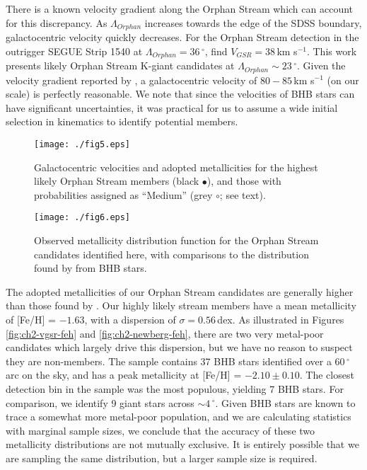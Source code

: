 There is a known velocity gradient along the Orphan Stream which can account for this discrepancy. As $\Lambda_{Orphan}$ increases towards the edge of the SDSS boundary, galactocentric velocity quickly decreases. For the Orphan Stream detection in the outrigger SEGUE Strip 1540 at $\Lambda_{Orphan} = 36\,^\circ$, \citet{Newberg_et-al_2010} find $V_{GSR} = 38$\,km s$^{-1}$. This work presents likely Orphan Stream K-giant candidates at $\Lambda_{Orphan} \sim 23\,^\circ$. Given the velocity gradient reported by \citet{Newberg_et-al_2010}, a galactocentric velocity of $80-85$\,km s$^{-1}$ (on our scale) is perfectly reasonable. We note that since the velocities of BHB stars can have significant uncertainties, it was practical for us to assume a wide initial selection in kinematics to identify potential members. 

\begin{figure}[h!]
	\texttt{[image: ./fig5.eps]}
	\caption{Galactocentric velocities and adopted metallicities for the highest likely Orphan Stream members (black $\bullet$), and those with probabilities assigned as ``Medium'' (grey $\circ$; see text).}
	\label{fig:vgsr-feh}
\end{figure}

\begin{figure}[h!]
	\texttt{[image: ./fig6.eps]}
	\caption{Observed metallicity distribution function for the Orphan Stream candidates identified here, with comparisons to the distribution found by \citet{Newberg_et-al_2010} from BHB stars.}
	\label{fig:newberg-feh}
\end{figure}

The adopted metallicities of our Orphan Stream candidates are generally higher than those found by \citet{Newberg_et-al_2010}. Our highly likely stream members have a mean metallicity of [Fe/H] = $-1.63$, with a dispersion of $\sigma = 0.56$\,dex. As illustrated in Figures \ref{fig:ch2-vgsr-feh} and \ref{fig:ch2-newberg-feh}, there are two very metal-poor candidates which largely drive this dispersion, but we have no reason to suspect they are non-members. The \citet{Newberg_et-al_2010} sample contains 37 BHB stars identified over a 60\,$^\circ$ arc on the sky, and has a peak metallicity at [Fe/H] = $-2.10 \pm 0.10$. The closest detection bin in the \citet{Newberg_et-al_2010} sample was the most populous, yielding 7 BHB stars. For comparison, we identify 9 giant stars across $\sim{}4\,^\circ$. Given BHB stars are known to trace a somewhat more metal-poor population, and we are calculating statistics with marginal sample sizes, we conclude that the accuracy of these two metallicity distributions are not mutually exclusive. It is entirely possible that we are sampling the same distribution, but a larger sample size is required.


